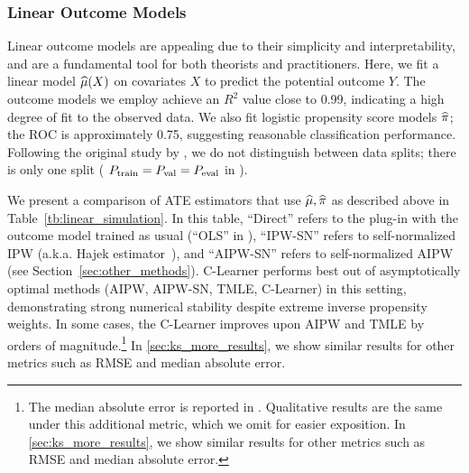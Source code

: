 \begin{table}[t]
\hfill
\hspace*{\fill}
\caption{%
Comparison of estimators on misspecified  \citet{KangSc07} settings in 1000 tabular simulations, for linear outcome models (). Asymptotically optimal methods are listed beneath the solid horizontal divider. 
Asymptotically optimal methods that use a logistic link are below the dashed horizontal divider. 
We highlight the best-performing \emph{asymptotically optimal} method, not including the logistic link, in \textbf{bold};
we highlight the best-performing \emph{asymptotically optimal} method \emph{overall} in \textbf{\textit{bold-italic}}. Standard errors are displayed in parentheses to the right of the point estimate.
}
    \label{tb:linear_simulation}
\end{table}







\subsubsection{Linear Outcome Models}
\label{sec:ks_linear}
Linear outcome models are appealing due to their simplicity and interpretability, and are a fundamental tool for both theorists and practitioners. 
 Here, 
we fit a linear model $\widehat{\mu}(X)$ on covariates $X$ to predict the potential outcome $Y$. %
The outcome models we employ achieve an $R^2$ value close to 0.99, indicating a high degree of fit to the observed data. 
We also fit logistic propensity score models $\widehat{\pi}$; the ROC is approximately 0.75, suggesting reasonable %
classification performance. %
Following the original study by \citet{KangSc07}, 
we do not distinguish between data splits; there is only one split (%
$P_{\rm train}=P_{\rm val}=P_{\rm eval}$ in 
). %




We present a comparison of ATE estimators that use $\widehat{\mu}, \widehat{\pi}$ as described above in Table~\ref{tb:linear_simulation}. 
In this table, ``Direct'' refers to the plug-in with the outcome model trained as usual (``OLS'' in \citep{KangSc07}), ``IPW-SN'' \citep{KangSc07} refers to self-normalized IPW (a.k.a. Hajek estimator~\citep{ding2023course}), and ``AIPW-SN'' refers to self-normalized AIPW (see Section~\ref{sec:other_methods}). 
C-Learner performs best out of asymptotically optimal methods (AIPW, AIPW-SN, TMLE, C-Learner) in this setting, demonstrating strong numerical stability despite extreme inverse propensity weights. In some cases, the C-Learner improves upon AIPW and TMLE by orders of magnitude.\ifdefined\msom\else \footnote{The median absolute error is reported in \cite{KangSc07}. Qualitative results are the same under this additional metric, which we omit for easier exposition. In \cref{sec:ks_more_results}, we show similar results for other metrics such as RMSE and median absolute error.} \fi\ifdefined\msom  
In \cref{sec:ks_more_results}, we show similar results for other metrics such as RMSE and median absolute error.\fi 




